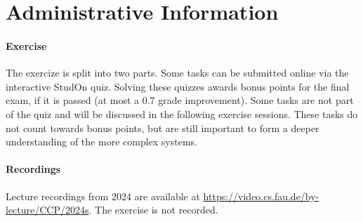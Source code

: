 \section{Administrative Information}
\label{sec:admin}

\paragraph{Exercise}
The exercize is split into two parts.
Some tasks can be submitted online via the interactive StudOn quiz.
Solving these quizzes awards bonus points for the final exam, if it is passed (at most a 0.7 grade improvement).
Some tasks are not part of the quiz and will be discussed in the following exercise sessions.
These tasks do not count towards bonus points, but are still important to form a deeper understanding of the more complex systems.

\paragraph{Recordings}
Lecture recordings from 2024 are available at \url{https://video.cs.fau.de/by-lecture/CCP/2024s}.
The exercise is not recorded.